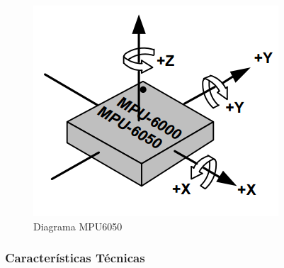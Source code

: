 \documentclass[12pt,a4paper]{article}
\begin{document}
			\begin{figure}[H]
				\centering
				\includegraphics[scale=0.5]{images/MPU6050}
				\caption{Diagrama MPU6050}
				\label{fig:MPU6050}
			\end{figure}
			
			\subsubsection{Características Técnicas}
			
\end{document}
